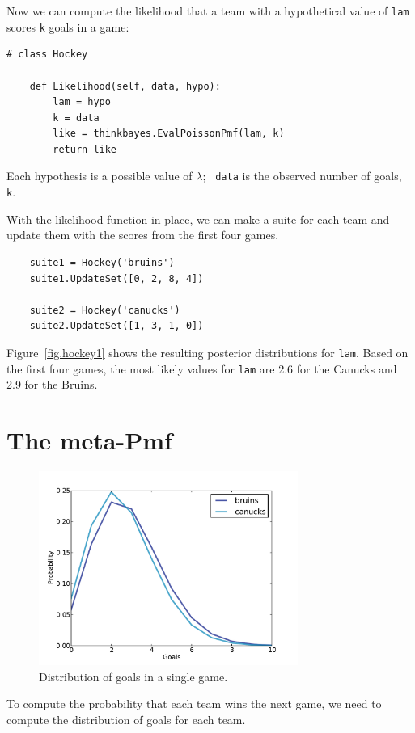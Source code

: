 \documentclass[12pt]{book}
\begin{document}
Now we can compute the likelihood that a team with a hypothetical
value of {\tt lam} scores {\tt k} goals in a game:

\begin{verbatim}
# class Hockey

    def Likelihood(self, data, hypo):
        lam = hypo
        k = data
        like = thinkbayes.EvalPoissonPmf(lam, k)
        return like
\end{verbatim}

Each hypothesis is a possible value of $\lambda$;  {\tt
  data} is the observed number of goals, {\tt k}.

With the likelihood function in place, we can make a suite for each
team and update them with the scores from the first four games.

\begin{verbatim}
    suite1 = Hockey('bruins')
    suite1.UpdateSet([0, 2, 8, 4])
     
    suite2 = Hockey('canucks')
    suite2.UpdateSet([1, 3, 1, 0])
\end{verbatim}  

Figure~\ref{fig.hockey1} shows the resulting posterior distributions
for {\tt lam}.  Based on the first four games, the most likely
values for {\tt lam} are 2.6 for the Canucks and 2.9 for the Bruins.


\section{The meta-Pmf}
\label{meta-pmf}

\begin{figure}
\centerline{\includegraphics[height=2.5in]{figs/hockey2.pdf}}
\caption{Distribution of goals in a single game.}
\label{fig.hockey2}
\end{figure}

To compute the probability that each team wins the next game,
we need to compute the distribution of goals for each team.
\end{document}
